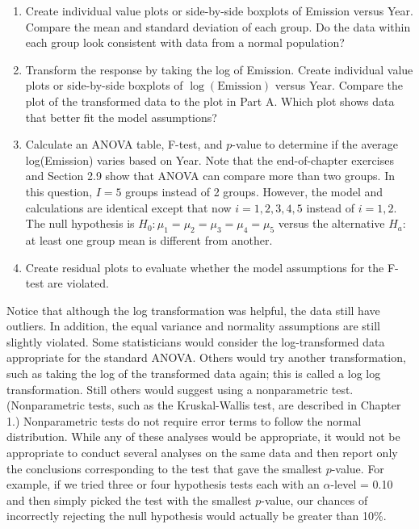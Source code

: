 \documentclass[
]{report}
\begin{document}
\begin{enumerate}
\def\labelenumi{(\alph{enumi})}
\item
  Create individual value plots or side-by-side boxplots of Emission versus Year. Compare the mean and standard deviation of each group. Do the data within each group look consistent with data from a normal population?
\item
  Transform the response by taking the log of Emission. Create individual value plots or side-by-side boxplots of \(\scriptstyle \log(\text{Emission})\) versus Year. Compare the plot of the transformed data to the plot in Part A. Which plot shows data that better fit the model assumptions?
\item
  Calculate an ANOVA table, F-test, and \(\scriptstyle p\)-value to determine if the average log(Emission) varies based on Year. Note that the end-of-chapter exercises and Section 2.9 show that ANOVA can compare more than two groups. In this question, \(\scriptstyle I = 5\) groups instead of 2 groups. However, the model and calculations are identical except that now \(\scriptstyle i = 1, 2, 3, 4, 5\) instead of \(\scriptstyle i = 1, 2\). The null hypothesis is \(\scriptstyle H_0\!:\! \mu_1 = \mu_2 = \mu_3 = \mu_4 = \mu_5\) versus the alternative \(\scriptstyle H_a\!:\!\) at least one group mean is different from another.
\item
  Create residual plots to evaluate whether the model assumptions for the F-test are violated.
\end{enumerate}

Notice that although the log transformation was helpful, the data still have outliers. In addition, the equal variance and normality assumptions are still slightly violated. Some statisticians would consider the log-transformed data appropriate for the standard ANOVA. Others would try another transformation, such as taking the log of the transformed data again; this is called a log log transformation. Still others would suggest using a nonparametric test. (Nonparametric tests, such as the Kruskal-Wallis test, are described in Chapter 1.) Nonparametric tests do not require error terms to follow the normal distribution. While any of these analyses would be appropriate, it would not be appropriate to conduct several analyses on the same data and then report only the conclusions corresponding to the test that gave the smallest \(\scriptstyle p\)-value. For example, if we tried three or four hypothesis tests each with an \(\scriptstyle \alpha\)-level = 0.10 and then simply picked the test with the smallest \(\scriptstyle p\)-value, our chances of incorrectly rejecting the null hypothesis would actually be greater than 10\%.
\end{document}

